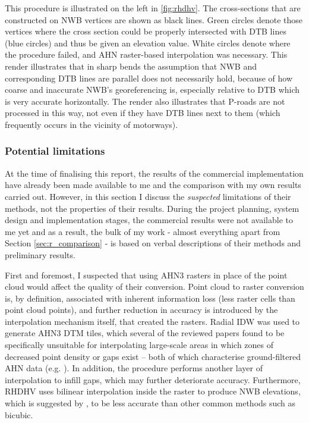 This procedure is illustrated on the left in \ref{fig:rhdhv}. The cross-sections that are constructed on NWB vertices are shown as black lines. Green circles denote those vertices where the cross section could be properly intersected with DTB lines (blue circles) and thus be given an elevation value. White circles denote where the procedure failed, and AHN raster-based interpolation was necessary. This render illustrates that in sharp bends the assumption that NWB and corresponding DTB lines are parallel does not necessarily hold, because of how coarse and inaccurate NWB's georeferencing is, especially relative to DTB which is very accurate horizontally. The render also illustrates that P-roads are not processed in this way, not even if they have DTB lines next to them (which frequently occurs in the vicinity of motorways).

\subsubsection{Potential limitations}

At the time of finalising this report, the results of the commercial implementation have already been made available to me and the comparison with my own results carried out. However, in this section I discuss the \textit{suspected} limitations of their methods, not the properties of their results. During the project planning, system design and implementation stages, the commercial results were not available to me yet and as a result, the bulk of my work - almost everything apart from Section \ref{sec:r_comparison} - is based on verbal descriptions of their methods and preliminary results.

First and foremost, I suspected that using AHN3 rasters in place of the point cloud would affect the quality of their conversion. Point cloud to raster conversion is, by definition, associated with inherent information loss (less raster cells than point cloud points), and further reduction in accuracy is introduced by the interpolation mechanism itself, that created the rasters. Radial IDW was used to generate AHN3 DTM tiles, which several of the reviewed papers found to be specifically unsuitable for interpolating large-scale areas in which zones of decreased point density or gaps exist – both of which characterise ground-filtered AHN data (e.g. \cite{guo_etal_2010}). In addition, the procedure performs another layer of interpolation to infill gaps, which may further deteriorate accuracy. Furthermore, RHDHV uses bilinear interpolation inside the raster to produce NWB elevations, which is suggested by \cite{shi_etal_2005}, to be less accurate than other common methods such as bicubic.

